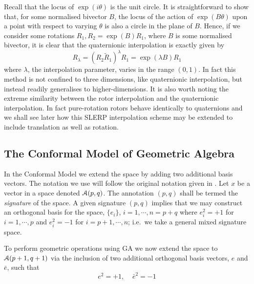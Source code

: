 Recall that the locus of $\exp(i\theta)$ is the unit
circle. It is straightforward to show that, for some normalised
bivector $B$, the locus of the action of $\exp(B\theta)$ upon a point with respect to varying
$\theta$ is also a circle in the plane of $B$. Hence, if we consider
some rotations $R_1, R_2 = \exp(B)R_1$, where 
$B$ is some normalised bivector, it is clear that
the quaternionic interpolation is exactly given by
\[
R_\lambda = (R_2 \tilde{R}_1)^\lambda R_1 = \exp(\lambda B) R_1
\]
where $\lambda$, the interpolation parameter, varies in the range $(0,1)$. 
In fact this method is not confined to three
dimensions, like quaternionic interpolation, but instead readily generalises
to higher-dimensions. It is also worth noting the extreme similarity between the
rotor interpolation and the quaternionic interpolation. In fact pure-rotation
rotors behave identically to quaternions and we shall see later how this SLERP
interpolation scheme may be extended to include translation as well as rotation.

\subsection{The Conformal Model of Geometric Algebra}

In the Conformal Model\cite{hestenes} we extend the space by adding two
additional basis vectors. The notation we use will follow the original
notation given in \cite{hestenes}. Let $x$ be a vector in a space denoted
${\mathcal{A}}(p,q)$.  The annotation $(p,q)$ shall be termed the \emph{signature}
of the space.  A given signature $(p,q)$ implies that we may construct an
orthogonal basis for the space, $\{e_i\}$, $i=1,\cdots,n=p+q$ where $e_i^2=+1$
for $i=1,\cdots,p$ and $e_i^2=-1$ for $i=p+1,\cdots,n$; i.e.\ we take a
general mixed signature space.  

To perform geometric operations using GA we now extend the space 
to ${\mathcal{A}}(p+1,q+1)$ via the inclusion of two additional orthogonal
basis  vectors, $e$ and
$\bar{e}$, such that
%
\[  e^2=+1,\;\;\;\; \bar{e}^2= -1
\]
%


